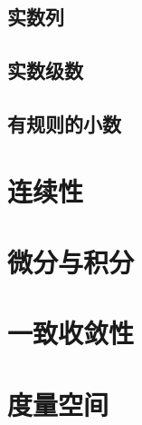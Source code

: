 \section{实数列}\label{sec0100104}

\section{实数级数}\label{sec0100105}

\section{有规则的小数}\label{sec0100106}


\chapter{连续性}\label{ch01002}


\chapter{微分与积分}\label{ch01003}

\chapter{一致收敛性}\label{ch01004}

\chapter{度量空间}\label{ch01005}












